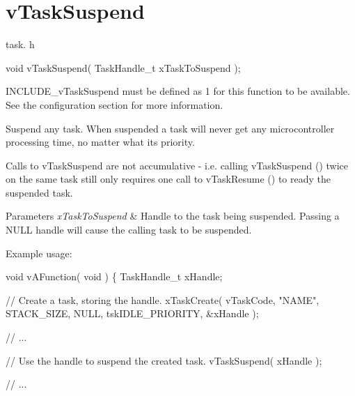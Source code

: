 \hypertarget{group__v_task_suspend}{}\section{v\+Task\+Suspend}
\label{group__v_task_suspend}
task. h 
\begin{DoxyPre}void vTaskSuspend( TaskHandle\_t xTaskToSuspend );\end{DoxyPre}


I\+N\+C\+L\+U\+D\+E\+\_\+v\+Task\+Suspend must be defined as 1 for this function to be available. See the configuration section for more information.

Suspend any task. When suspended a task will never get any microcontroller processing time, no matter what its priority.

Calls to v\+Task\+Suspend are not accumulative -\/ i.\+e. calling v\+Task\+Suspend () twice on the same task still only requires one call to v\+Task\+Resume () to ready the suspended task.


\begin{DoxyParams}{Parameters}
{\em x\+Task\+To\+Suspend} & Handle to the task being suspended. Passing a N\+U\+LL handle will cause the calling task to be suspended.\\
\hline
\end{DoxyParams}
Example usage\+: 
\begin{DoxyPre}
void vAFunction( void )
\{
TaskHandle\_t xHandle;\end{DoxyPre}



\begin{DoxyPre}    // Create a task, storing the handle.
    xTaskCreate( vTaskCode, "NAME", STACK\_SIZE, NULL, tskIDLE\_PRIORITY, \&xHandle );\end{DoxyPre}



\begin{DoxyPre}    // ...\end{DoxyPre}



\begin{DoxyPre}    // Use the handle to suspend the created task.
    vTaskSuspend( xHandle );\end{DoxyPre}



\begin{DoxyPre}    // ...\end{DoxyPre}



